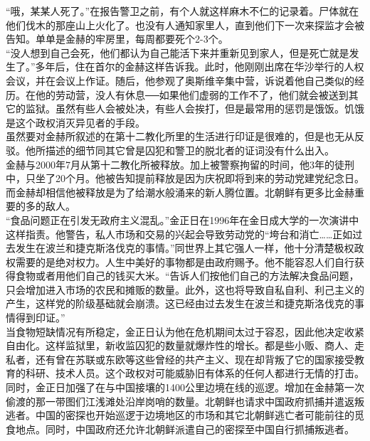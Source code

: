 \begin{multicols}{\theparacolNo}
“哦，某某人死了。”在报告警卫之前，有个人就这样麻木不仁的记录着。尸体就在他们伐木的那座山上火化了。也没有人通知家里人，直到他们下一次来探监才会被告知。单单是金赫的牢房里，每周都要死个2-3个。\\

“没人想到自己会死，他们都认为自己能活下来并重新见到家人，但是死亡就是发生了。”多年后，住在首尔的金赫这样告诉我。此时，他刚刚出席在华沙举行的人权会议，并在会议上作证。随后，他参观了奥斯维辛集中营，诉说着他自己类似的经历。在他的劳动营，没人有休息──如果他们虚弱的工作不了，他们就会被送到其它的监狱。虽然有些人会被处决，有些人会挨打，但是最常用的惩罚是饿饭。饥饿是这个政权消灭异见者的手段。\\

虽然要对金赫所叙述的在第十二教化所里的生活进行印证是很难的，但是也无从反驳。他所描述的细节同其它曾是囚犯和警卫的脱北者的证词没有什么出入。\\

金赫与2000年7月从第十二教化所被释放。加上被警察拘留的时间，他3年的徒刑中，只坐了20个月。他被告知提前释放是因为庆祝即将到来的劳动党建党纪念日。而金赫却相信他被释放是为了给潮水般涌来的新人腾位置。北朝鲜有更多比金赫重要的多的敌人。\\

“食品问题正在引发无政府主义混乱。”金正日在1996年在金日成大学的一次演讲中这样指责。他警告，私人市场和交易的兴起会导致劳动党的“垮台和消亡……正如过去发生在波兰和捷克斯洛伐克的事情。”同世界上其它强人一样，他十分清楚极权政权需要的是绝对权力。人生中美好的事物都是由政府赐予。他不能容忍人们自行获得食物或者用他们自己的钱买大米。“告诉人们按他们自己的方法解决食品问题，只会增加进入市场的农民和摊贩的数量。此外，这也将导致自私自利、利己主义的产生，这样党的阶级基础就会崩溃。这已经由过去发生在波兰和捷克斯洛伐克的事情得到印证。”\\

当食物短缺情况有所稳定，金正日认为他在危机期间太过于容忍，因此他决定收紧自由化。这样监狱里，新收监囚犯的数量就爆炸性的增长。都是些小贩、商人、走私者，还有曾在苏联或东欧等这些曾经的共产主义、现在却背叛了它的国家接受教育的科研、技术人员。这个政权对可能威胁旧有体系的任何人都进行无情的打击。\\

同时，金正日加强了在与中国接壤的1400公里边境在线的巡逻。增加在金赫第一次偷渡的那一带图们江浅滩处沿岸岗哨的数量。北朝鲜也请求中国政府抓捕并遣返叛逃者。中国的密探也开始巡逻于边境地区的市场和其它北朝鲜逃亡者可能前往的觅食地点。同时，中国政府还允许北朝鲜派遣自己的密探至中国自行抓捕叛逃者。\\


\end{multicols}
